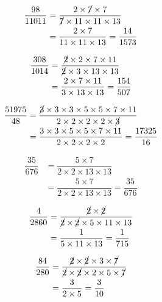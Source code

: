 {{\item\begin{align*}
    \dfrac{98}{11011} &=
    \dfrac{2 \times \cancel{7} \times 7}
    {\cancel{7} \times 11 \times 11 \times 13}\\ &=
    \dfrac{2 \times 7}
    {11 \times 11 \times 13} =
    \dfrac{14}{1573}
    \end{align*}

\item\begin{align*}
    \dfrac{308}{1014} &=
    \dfrac{\cancel{2} \times 2 \times 7 \times 11}
    {\cancel{2} \times 3 \times 13 \times 13}\\ &=
    \dfrac{2 \times 7 \times 11}
    {3 \times 13 \times 13} =
    \dfrac{154}{507}
    \end{align*}

\item\begin{align*}
    \dfrac{51975}{48} &=
    \dfrac{\cancel{3} \times 3 \times 3 \times 5 \times 5 \times 7 \times 11}
    {2 \times 2 \times 2 \times 2 \times \cancel{3}}\\ &=
    \dfrac{3 \times 3 \times 5 \times 5 \times 7 \times 11}
    {2 \times 2 \times 2 \times 2} =
    \dfrac{17325}{16}
    \end{align*}

\item\begin{align*}
    \dfrac{35}{676} &=
    \dfrac{5 \times 7}
    {2 \times 2 \times 13 \times 13}\\ &=
    \dfrac{5 \times 7}
    {2 \times 2 \times 13 \times 13} =
    \dfrac{35}{676}
    \end{align*}

\item\begin{align*}
    \dfrac{4}{2860} &=
    \dfrac{\cancel{2} \times \cancel{2}}
    {\cancel{2} \times \cancel{2} \times 5 \times 11 \times 13}\\ &=
    \dfrac{1}
    {5 \times 11 \times 13} =
    \dfrac{1}{715}
    \end{align*}

\item\begin{align*}
    \dfrac{84}{280} &=
    \dfrac{\cancel{2} \times \cancel{2} \times 3 \times \cancel{7}}
    {\cancel{2} \times \cancel{2} \times 2 \times 5 \times \cancel{7}}\\ &=
    \dfrac{3}
    {2 \times 5} =
    \dfrac{3}{10}
    \end{align*}

}}

